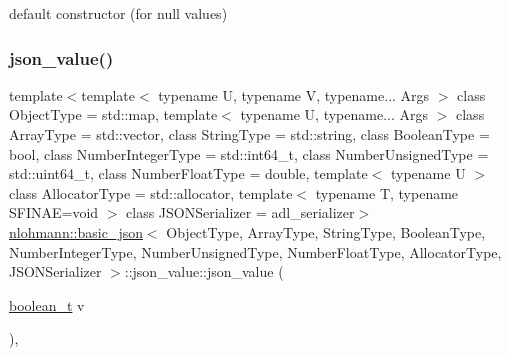 default constructor (for null values) 

\mbox{\label{unionnlohmann_1_1basic__json_1_1json__value_a2538617eb31ab405a3d4dd7b4a824654}} 
\subsubsection{\texorpdfstring{json\_value()}{json\_value()}\hspace{0.1cm}{\footnotesize\ttfamily [2/12]}}
{\footnotesize\ttfamily template$<$template$<$ typename U, typename V, typename... Args $>$ class Object\+Type = std\+::map, template$<$ typename U, typename... Args $>$ class Array\+Type = std\+::vector, class String\+Type  = std\+::string, class Boolean\+Type  = bool, class Number\+Integer\+Type  = std\+::int64\+\_\+t, class Number\+Unsigned\+Type  = std\+::uint64\+\_\+t, class Number\+Float\+Type  = double, template$<$ typename U $>$ class Allocator\+Type = std\+::allocator, template$<$ typename T, typename S\+F\+I\+N\+A\+E=void $>$ class J\+S\+O\+N\+Serializer = adl\+\_\+serializer$>$ \\
\mbox{\hyperlink{classnlohmann_1_1basic__json}{nlohmann\+::basic\+\_\+json}}$<$ Object\+Type, Array\+Type, String\+Type, Boolean\+Type, Number\+Integer\+Type, Number\+Unsigned\+Type, Number\+Float\+Type, Allocator\+Type, J\+S\+O\+N\+Serializer $>$\+::json\+\_\+value\+::json\+\_\+value (\begin{DoxyParamCaption}\item[{\mbox{\hyperlink{classnlohmann_1_1basic__json_a4c919102a9b4fe0d588af64801436082}{boolean\+\_\+t}}}]{v }\end{DoxyParamCaption})\hspace{0.3cm}{\ttfamily [inline]}, {\ttfamily [noexcept]}}



